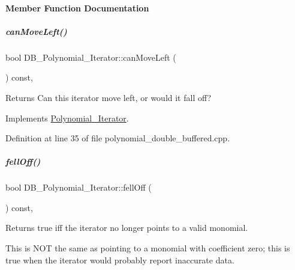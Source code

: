 \paragraph{Member Function Documentation}
\mbox{\label{group___iterator_group_a4094a88fd6d77894ff04960efd492ec6}} 
\subparagraph{\texorpdfstring{can\+Move\+Left()}{canMoveLeft()}}
{\footnotesize\ttfamily bool D\+B\+\_\+\+Polynomial\+\_\+\+Iterator\+::can\+Move\+Left (\begin{DoxyParamCaption}{ }\end{DoxyParamCaption}) const\hspace{0.3cm}{\ttfamily [override]}, {\ttfamily [virtual]}}

\begin{DoxyReturn}{Returns}
Can this iterator move left, or would it fall off? 
\end{DoxyReturn}


Implements \hyperlink{group___iterator_group_a7ab348897446bc182500f84df8a9e590}{Polynomial\+\_\+\+Iterator}.



Definition at line 35 of file polynomial\+\_\+double\+\_\+buffered.\+cpp.

\mbox{\label{group___iterator_group_aa5ee700b0d03a9e333f55a87b2439920}} 
\subparagraph{\texorpdfstring{fell\+Off()}{fellOff()}}
{\footnotesize\ttfamily bool D\+B\+\_\+\+Polynomial\+\_\+\+Iterator\+::fell\+Off (\begin{DoxyParamCaption}{ }\end{DoxyParamCaption}) const\hspace{0.3cm}{\ttfamily [override]}, {\ttfamily [virtual]}}

\begin{DoxyReturn}{Returns}
true iff the iterator no longer points to a valid monomial.
\end{DoxyReturn}
This is N\+OT the same as pointing to a monomial with coefficient zero; this is true when the iterator would probably report inaccurate data. 

